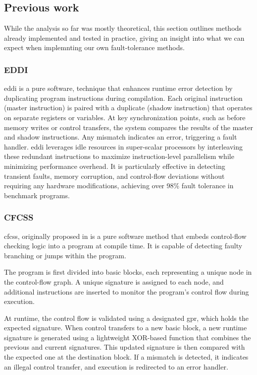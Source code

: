 \subsection{Previous work}

While the analysis so far was mostly theoretical, this section outlines methods already implemented and tested in practice, giving an insight into what we can expect when implemnting our own fault-tolerance methods.

\subsubsection{EDDI}

\acrfull{eddi} \cite{eddi} is a pure software, technique that enhances runtime error detection by duplicating program instructions during compilation. Each original instruction (master instruction) is paired with a duplicate (shadow instruction) that operates on separate registers or variables. At key synchronization points, such as before memory writes or control transfers, the system compares the results of the master and shadow instructions. Any mismatch indicates an error, triggering a fault handler. \acrshort{eddi} leverages idle resources in super-scalar processors by interleaving these redundant instructions to maximize instruction-level parallelism while minimizing performance overhead. It is particularly effective in detecting transient faults, memory corruption, and control-flow deviations without requiring any hardware modifications, achieving over 98\% fault tolerance in benchmark programs.


\subsubsection{CFCSS}

\acrfull{cfcss}, originally proposed in \cite{994926} is a pure software method that embeds control-flow checking logic into a program at compile time. It is capable of detecting faulty branching or jumps within the program. 

The program is first divided into basic blocks, each representing a unique node in the control-flow graph. A unique signature is assigned to each node, and additional instructions are inserted to monitor the program's control flow during execution.

At runtime, the control flow is validated using a designated \acrfull{gpr}, which holds the expected signature. When control transfers to a new basic block, a new runtime signature is generated using a lightweight XOR-based function that combines the previous and current signatures. This updated signature is then compared with the expected one at the destination block. If a mismatch is detected, it indicates an illegal control transfer, and execution is redirected to an error handler.

